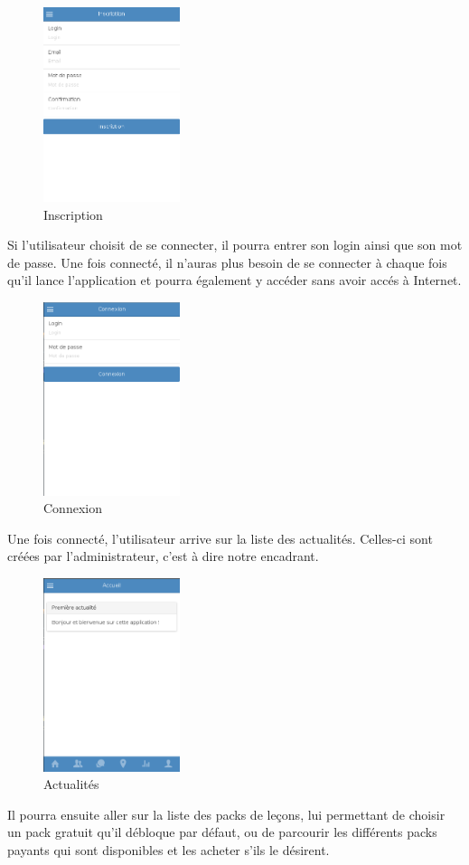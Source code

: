 \documentclass[pidr]{tnreport}
\begin{document}
\begin{figure}[h]
  \centering
  \includegraphics[width=4cm]{figures/inscription}
  \caption{Inscription}
  \label{fig:inscription}
\end{figure}
\newpage
Si l'utilisateur choisit de se connecter, il pourra entrer son login ainsi que son mot de passe. Une fois connecté, il n'auras plus besoin de se connecter à chaque fois qu'il lance l'application et pourra également y accéder sans avoir accés à Internet.

\begin{figure}[h]
  \centering
  \includegraphics[width=4cm]{figures/connexion}
  \caption{Connexion}
  \label{fig:connexion}
\end{figure}
Une fois connecté, l'utilisateur arrive sur la liste des actualités. Celles-ci sont créées par l'administrateur, c'est à dire notre encadrant.

\begin{figure}[h]
  \centering
  \includegraphics[width=4cm]{figures/news}
  \caption{Actualités}
  \label{fig:news}
\end{figure}
\newpage
Il pourra ensuite aller sur la liste des packs de leçons, lui permettant de choisir un pack gratuit qu'il débloque par défaut, ou de parcourir les différents packs payants qui sont disponibles et les acheter s'ils le désirent.
\end{document}

